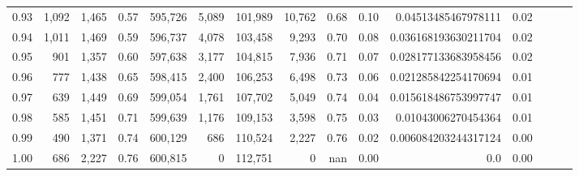 \begin{tabular}{rrrrrrrrrrrrrrr}
0.93 &  1,092 &  1,465 &  0.57 &  595,726 &    5,089 &  101,989 &   10,762 &  0.68 &  0.10 &   0.04513485467978111 &      0.02 \\
0.94 &  1,011 &  1,469 &  0.59 &  596,737 &    4,078 &  103,458 &    9,293 &  0.70 &  0.08 &  0.036168193630211704 &      0.02 \\
0.95 &    901 &  1,357 &  0.60 &  597,638 &    3,177 &  104,815 &    7,936 &  0.71 &  0.07 &  0.028177133683958456 &      0.02 \\
0.96 &    777 &  1,438 &  0.65 &  598,415 &    2,400 &  106,253 &    6,498 &  0.73 &  0.06 &  0.021285842254170694 &      0.01 \\
0.97 &    639 &  1,449 &  0.69 &  599,054 &    1,761 &  107,702 &    5,049 &  0.74 &  0.04 &  0.015618486753997747 &      0.01 \\
0.98 &    585 &  1,451 &  0.71 &  599,639 &    1,176 &  109,153 &    3,598 &  0.75 &  0.03 &   0.01043006270454364 &      0.01 \\
0.99 &    490 &  1,371 &  0.74 &  600,129 &      686 &  110,524 &    2,227 &  0.76 &  0.02 &  0.006084203244317124 &      0.00 \\
1.00 &    686 &  2,227 &  0.76 &  600,815 &        0 &  112,751 &        0 &   nan &  0.00 &                   0.0 &      0.00 \\
\bottomrule
\end{tabular}
